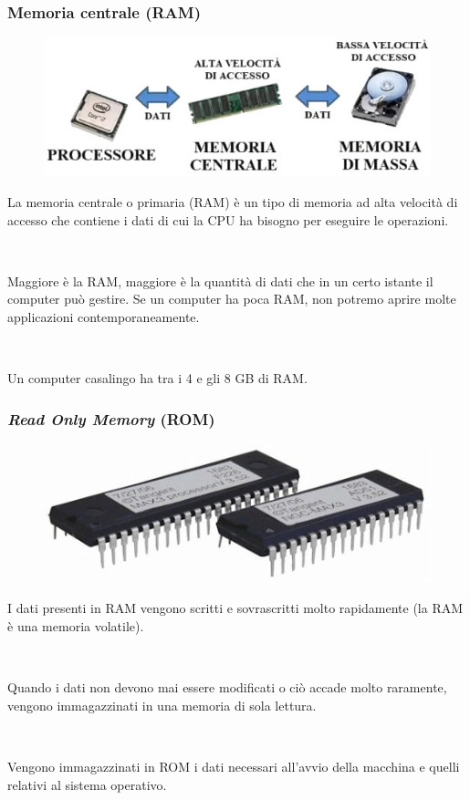 \documentclass[]{beamer}
\begin{document}
\begin{frame}
\frametitle{Memoria centrale (RAM)}
\begin{figure}
  \includegraphics[width=.5\columnwidth]{img/memorie.jpg}
\end{figure}
La memoria centrale o primaria (RAM) è un tipo di \alert<1>{memoria ad alta velocità di accesso} che contiene i dati di cui la CPU ha bisogno per eseguire le operazioni.\pause

~

\alert<2>{Maggiore è la RAM, maggiore è la quantità di dati che in un certo istante il computer può gestire.} Se un computer ha poca RAM, non potremo aprire molte applicazioni contemporaneamente.\pause

~

Un computer casalingo ha tra i 4 e gli 8 GB di RAM.
\end{frame}


\begin{frame}
\frametitle{\emph{Read Only Memory} (ROM)}
\begin{figure}
  \includegraphics[width=.5\columnwidth]{img/rom.png}
\end{figure}
I dati presenti in RAM vengono scritti e sovrascritti molto rapidamente (la RAM è una \alert<1>{memoria volatile}).\pause

~

Quando i dati non devono mai essere modificati o ciò accade molto raramente, vengono immagazzinati in una \alert<2>{memoria di sola lettura}.\pause

~

Vengono immagazzinati in ROM i dati necessari all'avvio della macchina e quelli relativi al \alert<3>{sistema operativo}.
\end{frame}
\end{document}
